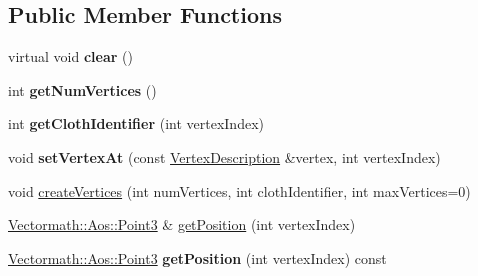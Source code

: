 \subsection*{Public Member Functions}
\begin{DoxyCompactItemize}
\item 
\hypertarget{classbt_soft_body_vertex_data_aff881f14a4ae961dd8420969e1115090}{virtual void {\bfseries clear} ()}\label{classbt_soft_body_vertex_data_aff881f14a4ae961dd8420969e1115090}

\item 
\hypertarget{classbt_soft_body_vertex_data_a701997d46cf9d90f0cd22abda13d572c}{int {\bfseries get\+Num\+Vertices} ()}\label{classbt_soft_body_vertex_data_a701997d46cf9d90f0cd22abda13d572c}

\item 
\hypertarget{classbt_soft_body_vertex_data_acfc7cafd9b13f9c442af038ca8e08dfc}{int {\bfseries get\+Cloth\+Identifier} (int vertex\+Index)}\label{classbt_soft_body_vertex_data_acfc7cafd9b13f9c442af038ca8e08dfc}

\item 
\hypertarget{classbt_soft_body_vertex_data_a3dc301457df55b2da8bd7aea67eea552}{void {\bfseries set\+Vertex\+At} (const \hyperlink{classbt_soft_body_vertex_data_1_1_vertex_description}{Vertex\+Description} \&vertex, int vertex\+Index)}\label{classbt_soft_body_vertex_data_a3dc301457df55b2da8bd7aea67eea552}

\item 
void \hyperlink{classbt_soft_body_vertex_data_ac3ec63020379a29c984904deb4fc92b2}{create\+Vertices} (int num\+Vertices, int cloth\+Identifier, int max\+Vertices=0)
\item 
\hyperlink{class_vectormath_1_1_aos_1_1_point3}{Vectormath\+::\+Aos\+::\+Point3} \& \hyperlink{classbt_soft_body_vertex_data_ac5d2dd4b383b386080c45a4fcf45f4f4}{get\+Position} (int vertex\+Index)
\item 
\hypertarget{classbt_soft_body_vertex_data_ab338e76579d6ee932d6c1ec1f389af1f}{\hyperlink{class_vectormath_1_1_aos_1_1_point3}{Vectormath\+::\+Aos\+::\+Point3} {\bfseries get\+Position} (int vertex\+Index) const }\label{classbt_soft_body_vertex_data_ab338e76579d6ee932d6c1ec1f389af1f}


\end{DoxyCompactItemize}
